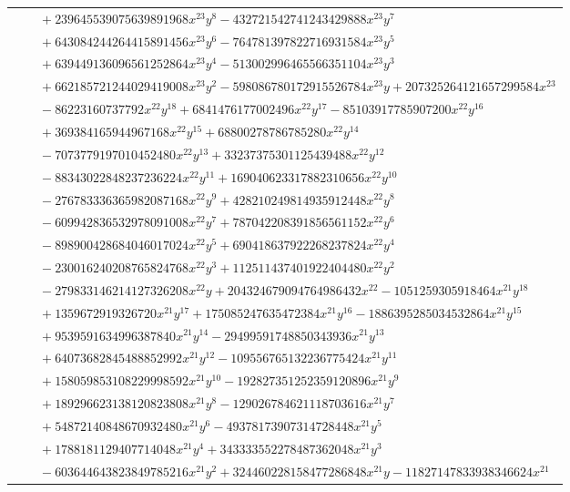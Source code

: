 \documentclass[11pt]{article}
\begin{document}
\begin{longtable}{@{}ll@{}}
 & $\quad +239645539075639891968x^{23}y^{8}-432721542741243429888x^{23}y^{7}$\\
 & $\quad +643084244264415891456x^{23}y^{6}-764781397822716931584x^{23}y^{5}$\\
 & $\quad +639449136096561252864x^{23}y^{4}-513002996465566351104x^{23}y^{3}$\\
 & $\quad +662185721244029419008x^{23}y^{2}-598086780172915526784x^{23}y+207325264121657299584x^{23}$\\
 & $\quad -86223160737792x^{22}y^{18}+6841476177002496x^{22}y^{17}-85103917785907200x^{22}y^{16}$\\
 & $\quad +369384165944967168x^{22}y^{15}+68800278786785280x^{22}y^{14}$\\
 & $\quad -7073779197010452480x^{22}y^{13}+33237375301125439488x^{22}y^{12}$\\
 & $\quad -88343022848237236224x^{22}y^{11}+169040623317882310656x^{22}y^{10}$\\
 & $\quad -276783336365982087168x^{22}y^{9}+428210249814935912448x^{22}y^{8}$\\
 & $\quad -609942836532978091008x^{22}y^{7}+787042208391856561152x^{22}y^{6}$\\
 & $\quad -898900428684046017024x^{22}y^{5}+690418637922268237824x^{22}y^{4}$\\
 & $\quad -230016240208765824768x^{22}y^{3}+112511437401922404480x^{22}y^{2}$\\
 & $\quad -279833146214127326208x^{22}y+204324679094764986432x^{22}-1051259305918464x^{21}y^{18}$\\
 & $\quad +1359672919326720x^{21}y^{17}+175085247635472384x^{21}y^{16}-1886395285034532864x^{21}y^{15}$\\
 & $\quad +9539591634996387840x^{21}y^{14}-29499591748850343936x^{21}y^{13}$\\
 & $\quad +64073682845488852992x^{21}y^{12}-109556765132236775424x^{21}y^{11}$\\
 & $\quad +158059853108229998592x^{21}y^{10}-192827351252359120896x^{21}y^{9}$\\
 & $\quad +189296623138120823808x^{21}y^{8}-129026784621118703616x^{21}y^{7}$\\
 & $\quad +54872140848670932480x^{21}y^{6}-49378173907314728448x^{21}y^{5}$\\
 & $\quad +1788181129407714048x^{21}y^{4}+343333552278487362048x^{21}y^{3}$\\
 & $\quad -603644643823849785216x^{21}y^{2}+324460228158477286848x^{21}y-11827147833938346624x^{21}$\\

\end{longtable}
\end{document}
